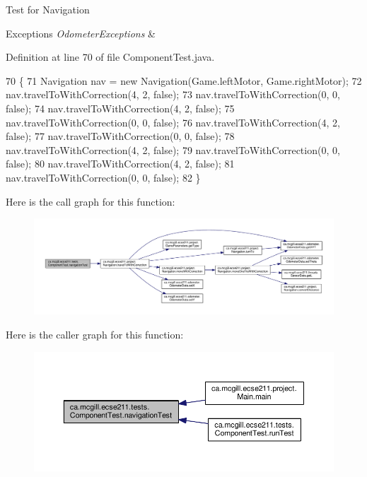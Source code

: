 Test for Navigation


\begin{DoxyExceptions}{Exceptions}
{\em Odometer\+Exceptions} & \\
\hline
\end{DoxyExceptions}


Definition at line 70 of file Component\+Test.\+java.


\begin{DoxyCode}
70                                                                 \{
71     Navigation nav = \textcolor{keyword}{new} Navigation(Game.leftMotor, Game.rightMotor);
72     nav.travelToWithCorrection(4, 2, \textcolor{keyword}{false});
73     nav.travelToWithCorrection(0, 0, \textcolor{keyword}{false});
74     nav.travelToWithCorrection(4, 2, \textcolor{keyword}{false});
75     nav.travelToWithCorrection(0, 0, \textcolor{keyword}{false});
76     nav.travelToWithCorrection(4, 2, \textcolor{keyword}{false});
77     nav.travelToWithCorrection(0, 0, \textcolor{keyword}{false});
78     nav.travelToWithCorrection(4, 2, \textcolor{keyword}{false});
79     nav.travelToWithCorrection(0, 0, \textcolor{keyword}{false});
80     nav.travelToWithCorrection(4, 2, \textcolor{keyword}{false});
81     nav.travelToWithCorrection(0, 0, \textcolor{keyword}{false});
82   \}
\end{DoxyCode}
Here is the call graph for this function\+:\nopagebreak
\begin{figure}[H]
\begin{center}
\leavevmode
\includegraphics[width=350pt]{enumca_1_1mcgill_1_1ecse211_1_1tests_1_1_component_test_aa40592bb550b3526402faddbc0d890c7_cgraph}
\end{center}
\end{figure}
Here is the caller graph for this function\+:
\nopagebreak
\begin{figure}[H]
\begin{center}
\leavevmode
\includegraphics[width=350pt]{enumca_1_1mcgill_1_1ecse211_1_1tests_1_1_component_test_aa40592bb550b3526402faddbc0d890c7_icgraph}
\end{center}
\end{figure}
